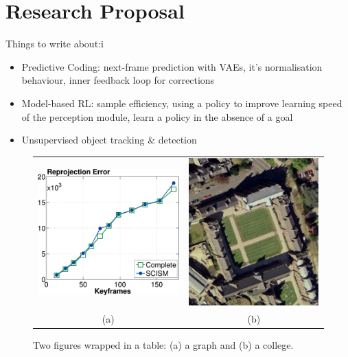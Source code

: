 \section{Research Proposal}

Things to write about:i
\begin{itemize}
	\item Predictive Coding: next-frame prediction with VAEs, it's normalisation behaviour, inner feedback loop for corrections
	\item Model-based RL: sample efficiency, using a policy to improve learning speed of the perception module, learn a policy in the absence of a goal
	\item Unsupervised object tracking \& detection
\end{itemize}


\begin{figure}
\centering
\begin{tabular}{cc}     
 \includegraphics[height=0.42\columnwidth]{Figs/fig01.pdf} &
 \includegraphics[height=0.40\columnwidth]{Figs/fig02.pdf} \\
 (a) & (b)
\end{tabular}
\caption{Two figures wrapped in a table: (a) a graph and (b) a college.}
\label{fig:myfirstfigure}
\end{figure}